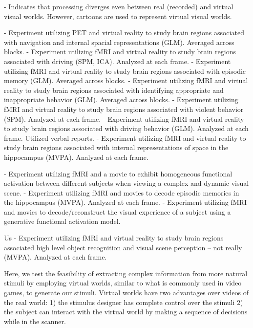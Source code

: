 \documentclass[preprint,5p,authoryear]{elsarticle}
\begin{document}
\citep{Han2005} - Indicates that processing diverges even between real (recorded) and virtual visual worlds. However, cartoons are used to represent virtual visual worlds.

\citep{Maguire1998} - Experiment utilizing PET and virtual reality to study brain regions associated with navigation and internal spacial representations (GLM). Averaged across blocks.
\citep{Calhoun2002} - Experiment utilizing fMRI and virtual reality to study brain regions associated with driving (SPM, ICA). Analyzed at each frame.
\citep{King2005} - Experiment utilizing fMRI and virtual reality to study brain regions associated with episodic memory (GLM). Averaged across blocks.
\citep{King2006} - Experiment utilizing fMRI and virtual reality to study brain regions associated with identifying appropriate and inappropriate behavior (GLM). Averaged across blocks.
\citep{Mathiak2006} - Experiment utilizing fMRI and virtual reality to study brain regions associated with violent behavior (SPM). Analyzed at each frame.
\citep{Spiers2007a} - Experiment utilizing fMRI and virtual reality to study brain regions associated with driving behavior (GLM). Analyzed at each frame. Utilized verbal reports.
\citep{Hassabis2009} - Experiment utilizing fMRI and virtual reality to study brain regions associated with internal representations of space in the hippocampus (MVPA). Analyzed at each frame.

\citep{Hasson2004} - Experiment utilizing fMRI and a movie to exhibit homogeneous functional activation between different subjects when viewing a complex and dynamic visual scene.
\citep{Chadwick2010} - Experiment utilizing fMRI and movies to decode episodic memories in the hippocampus (MVPA). Analyzed at each frame.
\citep{Nishimoto2011} - Experiment utilizing fMRI and movies to decode/reconstruct the visual experience of a subject using a generative functional activation model.

Us - Experiment utilizing fMRI and virtual reality to study brain regions associated high level object recognition and visual scene perception -- not really (MVPA). Analyzed at each frame.

Here, we test the feasibility of extracting complex information from more natural stimuli by employing virtual worlds, similar to what is commonly used in video games, to generate our  stimuli.
Virtual worlds have two advantages over videos of the real world: 1) the stimulus designer has complete control over the stimuli 2) the subject can interact with the virtual world by making a sequence of decisions while in the scanner.
\end{document}
